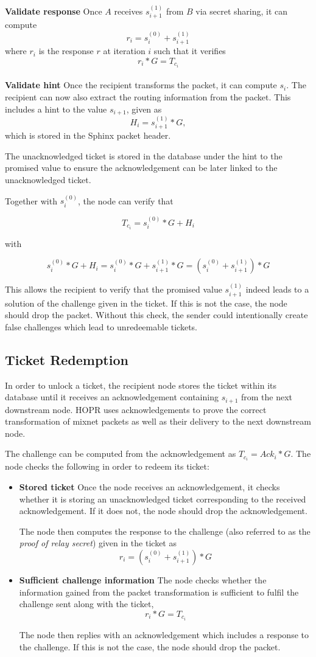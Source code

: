\textbf{Validate response} Once $A$ receives $s_{i+1}^{(1)}$ from $B$ via secret sharing, it can compute $$r_i=s_i^{(0)}+s_{i+1}^{(1)}$$ where $r_i$ is the response $r$ at iteration $i$ such that it verifies
$$r_i*G=T_{c_i}$$
\\\textbf{Validate hint} Once the recipient transforms the packet, it can compute $s_i$. The recipient can now also extract the routing information from the packet.
This includes a hint to the value $s_{i+1}$, given as $$H_i=s_{i+1}^{(1)}*G,$$ which is stored in the Sphinx packet header.

The unacknowledged ticket is stored in the database under the hint to the promised value to ensure the acknowledgement can be later linked to the unacknowledged ticket.

Together with $s_i^{(0)}$, the node can verify that

$$T_{c_i}=s_i^{(0)}*G+H_i$$

with

$$s_i^{(0)}*G+H_i=s_i^{(0)}*G+s_{i+1}^{(1)}*G=(s_i^{(0)}+s_{i+1}^{(1)})*G$$

This allows the recipient to verify that the promised value $s_{i+1}^{(1)}$ indeed leads to a solution of the challenge given in the ticket. If this is not the case, the node should drop the packet. Without this check, the sender could intentionally create false challenges which lead to unredeemable tickets.


\subsection{Ticket Redemption}

In order to unlock a ticket, the recipient node stores the ticket within its database until it receives an acknowledgement containing $s_{i+1}$ from the next downstream node. HOPR uses acknowledgements to prove the correct transformation of mixnet packets as well as their delivery to the next downstream node.

The challenge can be computed from the acknowledgement as $T_{c_i}=Ack_i*G$. The node checks the following in order to redeem its ticket:
\begin{itemize}
      \item
            \textbf{Stored ticket} Once the node receives an acknowledgement, it checks whether it is storing an unacknowledged ticket corresponding to the received acknowledgement. If it does not, the node should drop the acknowledgement.

            The node then computes the response to the challenge (also referred to as the \textit{proof of relay secret}) given in the ticket as $$r_i=(s_i^{(0)}+s_{i+1}^{(1)})*G$$
      \item
            \textbf{Sufficient challenge information} The node checks whether the information gained from the packet transformation is sufficient to fulfil the challenge sent along with the ticket, $$r_i*G=T_{c_i}$$

            The node then replies with an acknowledgement which includes a response to the challenge. If this is not the case, the node should drop the packet.
\end{itemize}

